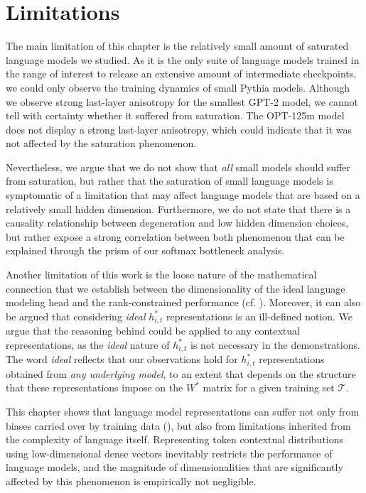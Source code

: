 \section*{Limitations}
The main limitation of this chapter is the relatively small amount of saturated language models we studied. As it is the only suite of language models trained in the range of interest to release an extensive amount of intermediate checkpoints, we could only observe the training dynamics of small Pythia models. Although we observe strong last-layer anisotropy for the smallest GPT-2 model, we cannot tell with certainty whether it suffered from saturation. The OPT-125m model does not display a strong last-layer anisotropy, which could indicate that it was not affected by the saturation phenomenon.

Nevertheless, we argue that we do not show that \textit{all} small models should suffer from saturation, but rather that the saturation of small language models is symptomatic of a limitation that may affect language models that are based on a relatively small hidden dimension. Furthermore, we do not state that there is a causality relationship between degeneration and low hidden dimension choices, but rather expose a strong correlation between both phenomenon that can be explained through the prism of our softmax bottleneck analysis.


Another limitation of this work is the loose nature of the mathematical connection that we establish between the dimensionality of the ideal language modeling head and the rank-constrained performance (cf. ). Moreover, it can also be argued that considering \textit{ideal} $h_{i,t}^*$ representations is an ill-defined notion. We argue that the reasoning behind  could be applied to any contextual representations, as the \textit{ideal} nature of $h_{i,t}^*$ is not necessary in the demonstrations. The word \textit{ideal} reflects that our observations hold for $h_{i,t}^*$ representations obtained from \textit{any underlying model}, to an extent that depends on the structure that these representations impose on the $W^*$ matrix for a given training set $\mathcal{T}$.


\vspace{2em}

This chapter shows that language model representations can suffer not only from biases carried over by training data (), but also from limitations inherited from the complexity of language itself. Representing token contextual distributions using low-dimensional dense vectors inevitably restricts the performance of language models, and the magnitude of dimensionalities that are significantly affected by this phenomenon is empirically not negligible. 

